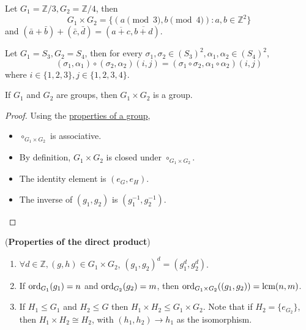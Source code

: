 \begin{example}
	Let $G_1 = \mathbb{Z} / 3, G_2 = \mathbb{Z} / 4$, then
	\[
		G_1 \times G_2 = \{ (a \pmod{3}, b \pmod{4}): a, b \in \mathbb{Z}^2 \}
	\]
	and $(\bar{a} + \bar{b}) + (\bar{c}, \bar{d}) = (\overline{a + c}, \overline{b + d})$.
\end{example}

\begin{example}
	Let $G_1 = S_3, G_2 = S_4$, then for every $\sigma_1, \sigma_2 \in {(S_3)}^2, \alpha_1, \alpha_2 \in {(S_4)}^2$,
	\[
		(\sigma_1, \alpha_1) \circ (\sigma_2, \alpha_2) (i, j) = (\sigma_1 \circ \sigma_2, \alpha_1 \circ \alpha_2) (i, j)
	\]
	where $i \in \{ 1, 2, 3 \}, j \in \{ 1, 2, 3, 4 \}$.
\end{example}

\begin{lemma}
	If $G_1$ and $G_2$ are groups, then $G_1 \times G_2$ is a group.
\end{lemma}

\begin{proof}
	Using the \hyperref[def:group]{properties of a group},
	\begin{itemize}
		\item $\circ_{G_1 \times G_2}$ is associative.
		\item By definition, $G_1 \times G_2$ is closed under $\circ_{G_1 \times G_2}$.
		\item The identity element is $(e_G, e_H)$.
		\item The inverse of $(g_1, g_2)$ is $(g_1^{-1}, g_2^{-1})$.
	\end{itemize}
\end{proof}

\begin{proposition}\label{prop:directProductProperties}
	(\textbf{Properties of the direct product})
	\begin{enumerate}
		\item $\forall d \in \mathbb{Z}, (g, h) \in G_1 \times G_2$, ${(g_1, g_2)}^d = (g_1^d, g_2^d)$.
		\item If $\text{ord}_{G_1}(g_1) = n$ and $\text{ord}_{G_2}(g_2) = m$, then $\text{ord}_{G_1 \times G_2}((g_1, g_2)) = \text{lcm}(n, m)$.
		\item If $H_1 \le G_1$ and $H_2 \le G$ then $H_1 \times H_2 \le G_1 \times G_2$. Note that if $H_2 = \{ e_{G_2} \}$, then $H_1 \times H_2 \cong H_2$, with $(h_1, h_2) \rightarrow h_1$ as the isomorphism.
	\end{enumerate}
\end{proposition}

